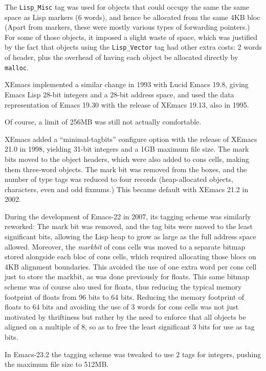 \documentclass[format=acmsmall, review]{acmart}
\newcommand \Elisp {Emacs Lisp}
\begin{document}
The \texttt{Lisp\_Misc} tag was used for objects that could occupy the same
the same space as Lisp markers (6 words), and hence be allocated from the same
4KB bloc  (Apart from markers, these were mostly various types of
forwarding pointers.)  For some of those objects, it imposed a slight waste of space,
which was justified by the fact that objects using the \texttt{Lisp\_Vector}
tag had other extra costs: 2 words of header, plus the overhead of having
each object be allocated directly by \texttt{malloc}.

XEmacs implemented a similar change in 1993 with Lucid Emacs 19.8,
giving \Elisp{} 28-bit integers and a 28-bit address space, and
used the data representation of Emacs 19.30 with the release of XEmacs 19.13, also in
1995.


Of course, a limit of 256\;MB was still not actually comfortable.

XEmacs added a ``minimal-tagbits'' configure option with the release
of XEmacs 21.0 in 1998, yielding 31-bit integers and a 1GB maximum
file size.  The mark bits moved to the object headers, which were also
added to cons cells, making them three-word objects.
The mark bit was removed from the boxes, and the number of
type tags was reduced to four records (heap-allocated objects,
characters, even and odd fixnums.)  This became default with XEmacs
21.2 in 2002.

During the development of Emacs-22 in 2007, its tagging scheme was
similarly reworked: The mark bit was removed, and the tag bits were
moved to the least significant bits, allowing the Lisp heap to grow as
large as the full address space allowed.
Moreover, the \emph{markbit} of cons cells was moved to a separate bitmap
stored alongside each bloc of cons cells, which required allocating those
blocs on 4KB alignment boundaries.  This avoided the use of one extra word
per cons cell just to store the markbit, as was done previously for floats.
This same bitmap scheme
was of course also used for floats, thus reducing the typical memory footprint of
floats from 96 bits to 64 bits.  Reducing the memory footprint of
floats to 64 bits
and avoiding the use of 3 words for cons cells was not just motivated by
thriftiness but rather by the need to enforce that all objects be aligned on
a multiple of 8, so as to free the least significant 3 bits for use as
tag bits.

In Emacs-23.2 the tagging scheme was tweaked to use 2 tags for integers,
pushing the maximum file size to 512\;MB.
\end{document}

